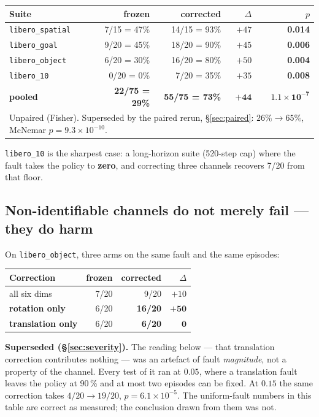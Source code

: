 \documentclass[11pt,a4paper]{article}
\newcommand{\code}[1]{\texttt{\small #1}}
\begin{document}
\begin{center}
\begin{tabular}{lrrrr}
\toprule
\textbf{Suite} & \textbf{frozen} & \textbf{corrected} & $\Delta$ & $p$ \\
\midrule
\code{libero\_spatial} & 7/15 = 47\%  & 14/15 = 93\% & $+47$ & \textbf{0.014} \\
\code{libero\_goal}    & 9/20 = 45\%  & 18/20 = 90\% & $+45$ & \textbf{0.006} \\
\code{libero\_object}  & 6/20 = 30\%  & 16/20 = 80\% & $+50$ & \textbf{0.004} \\
\code{libero\_10}      & 0/20 = 0\%   & 7/20 = 35\%  & $+35$ & \textbf{0.008} \\
\midrule
\textbf{pooled} & \textbf{22/75 = 29\%} & \textbf{55/75 = 73\%} & $\mathbf{+44}$ & $\mathbf{1.1\times 10^{-7}}$ \\
\multicolumn{5}{l}{\footnotesize Unpaired (Fisher). Superseded by the paired rerun,
\S\ref{sec:paired}: $26\% \to 65\%$, McNemar $p = 9.3\times 10^{-10}$.} \\
\bottomrule
\end{tabular}
\end{center}

\code{libero\_10} is the sharpest case: a long-horizon suite (520-step cap) where
the fault takes the policy to \textbf{zero}, and correcting three channels
recovers 7/20 from that floor.

\subsection{Non-identifiable channels do not merely fail --- they do harm}

On \code{libero\_object}, three arms on the same fault and the same episodes:

\begin{center}
\begin{tabular}{lrrr}
\toprule
\textbf{Correction} & \textbf{frozen} & \textbf{corrected} & $\Delta$ \\
\midrule
all six dims          & 7/20 & 9/20  & $+10$ \\
\textbf{rotation only} & 6/20 & \textbf{16/20} & $\mathbf{+50}$ \\
\textbf{translation only} & 6/20 & \textbf{6/20} & $\mathbf{0}$ \\
\bottomrule
\end{tabular}
\end{center}

\begin{tcolorbox}[colback=red!4,colframe=red!45!black]
\textbf{Superseded (\S\ref{sec:severity}).} The reading below --- that translation
correction contributes nothing --- was an artefact of fault \emph{magnitude}, not a
property of the channel. Every test of it ran at $0.05$, where a translation fault
leaves the policy at 90\,\% and at most two episodes can be fixed. At $0.15$ the same
correction takes $4/20 \to 19/20$, $p = 6.1\times 10^{-5}$. The uniform-fault numbers
in this table are correct as measured; the conclusion drawn from them was not.
\end{tcolorbox}
\end{document}
